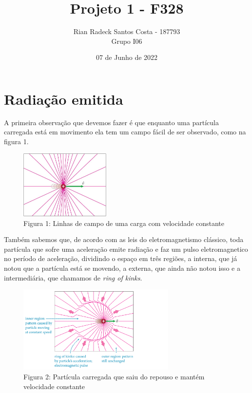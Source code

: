 \documentclass[12pt, letterpaper]{article}
\title{Projeto 1 - F328}
\author{Rian Radeck Santos Costa - 187793 \\ Grupo I06}
\date{07 de Junho de 2022}
\begin{document}
\maketitle 

\newpage

\section{Radiação emitida}
    \par
    A primeira observação que devemos fazer é que enquanto uma partícula carregada está em movimento ela tem um campo fácil de ser observado, como na figura 1.
    
    \begin{figure}[h]
        \centering
        \includegraphics[width=0.4\textwidth]{moving particle}
        \\{Figura 1: Linhas de campo de uma carga com velocidade constante}
        \label{fig:fig1}
    \end{figure}

    Também sabemos que, de acordo com as leis do eletromagnetismo clássico, toda partícula que sofre uma aceleração emite radiação e faz um pulso eletromagnetico no período de aceleração, dividindo o espaço em três regiões, a interna, que já notou que a partícula está se movendo, a externa, que ainda não notou isso e a intermediária, que chamamos de \textit{ring of kinks}.

    \begin{figure}[h]
        \centering
        \includegraphics[width=0.7\textwidth]{pulse}
        \\{Figura 2: Partícula carregada que saiu do repouso e mantém velocidade constante}
        \label{fig:fig2}
    \end{figure}
\end{document}
